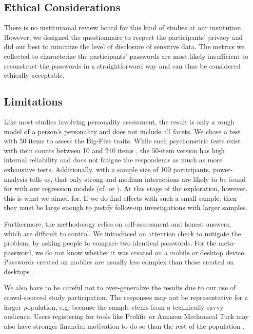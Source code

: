 \subsection{Ethical Considerations}
There is no institutional review board for this kind of studies at our institution. However, we designed the questionnaire to respect the participants' privacy and did our best to minimize the level of disclosure of sensitive data. The metrics we collected to characterize the participants' passwords are most likely insufficient to reconstruct the passwords in a straightforward way and can thus be considered ethically acceptable. 


\subsection{Limitations}

Like most studies involving personality assessment, the result is only a rough model of a person's personality and does not include all facets. We chose a test with 50 items to assess the Big-Five traits. While such psychometric tests exist with item counts between 10 \cite{Gosling2003TIPI} and 240 items \cite{Costa1992NEO}, the 50-item version has high internal reliability and does not fatigue the respondents as much as more exhaustive tests. Additionally, with a sample size of 100 participants, power-analysis tells us, that only strong and medium interactions are likely to be found for with our regression models (cf. \cite{Shevlin1998SampleSize} or \cite[p. 223]{Field2005DiscoveringStatistics}). At this stage of the exploration, however, this is what we aimed for. If we do find effects with such a small sample, then they must be large enough to justify follow-up investigations with larger samples. 

Furthermore, the methodology relies on self-assessment and honest answers, which are difficult to control. We introduced an attention check to mitigate the problem, by asking people to compare two identical passwords. For the meta-password, we do not know whether it was created on a mobile or desktop device. Passwords created on mobiles are usually less complex than those created on desktops \cite{Melicher2016UsabilityMobileTextPasswords, VonZezschwitz2014HoneyIShrunkTheKeys}. 

We also have to be careful not to over-generalize the results due to our use of crowd-sourced study participation. The responses may not be representative for a larger population, e.g. because the sample stems from a technically savvy audience. Users registering for tools like Prolific or Amazon Mechanical Turk may also have stronger financial motivation to do so than the rest of the population \cite{Ross2010WhoAreTheCrowdworkers}. 

